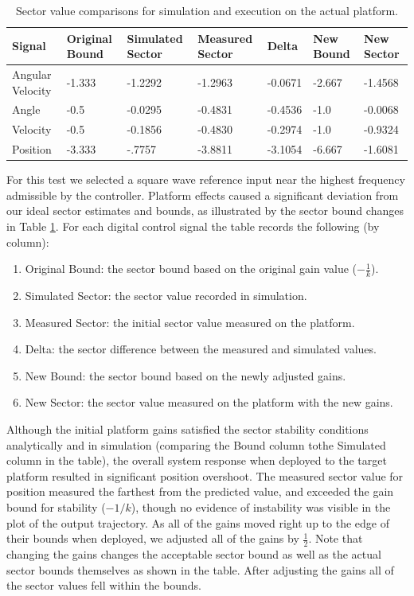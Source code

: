 \begin{table}[htb]
\centering

\begin{tabular}[width=0.85\columnwidth]{ | l | l | l | l | l | l | l | }

\hline
\textbf{Signal} & \textbf{Original Bound} & \textbf{Simulated Sector} & \textbf{Measured Sector} & \textbf{Delta} & \textbf{New Bound} & \textbf{New Sector} \\
\hline \hline
Angular Velocity & -1.333 & -1.2292 & -1.2963 & -0.0671 & -2.667 & -1.4568 \\
\hline
Angle & -0.5 & -0.0295 & -0.4831 & -0.4536 & -1.0 & -0.0068 \\
\hline
Velocity & -0.5 & -0.1856 & -0.4830 & -0.2974 & -1.0 &  -0.9324 \\
\hline
Position & -3.333 & -.7757 & -3.8811 & -3.1054 & -6.667 & -1.6081 \\
\hline
\end{tabular}
\caption{Sector value comparisons for simulation and execution on the actual platform.}
\label{tab:sectors}
\end{table}

For this test we selected a square wave reference input near the highest frequency admissible by 
the controller.  Platform effects caused a significant deviation from our ideal sector estimates and 
bounds, as illustrated by the sector bound changes in Table \ref{tab:sectors}. For each digital 
control signal the table records the following (by column):
\begin{enumerate}
 \item Original Bound: the sector bound based on the original gain value ($-\frac{1}{k}$).
 \item Simulated Sector: the sector value recorded in simulation.
 \item Measured Sector: the initial sector value measured on the platform.
 \item Delta: the sector difference between the measured and simulated values.
 \item New Bound: the sector bound based on the newly adjusted gains.
 \item New Sector: the sector value measured on the platform with the new gains.
\end{enumerate}
Although the initial platform gains satisfied the sector stability conditions analytically and in 
simulation (comparing the Bound column tothe Simulated column in the table), the overall system 
response when deployed to the target platform resulted in significant position overshoot.  The 
measured sector value for position measured the farthest from the predicted value, and exceeded 
the gain bound for stability ($-1/k$), though no evidence of instability was visible in the 
plot of the output trajectory.  As all of the gains moved right up to the edge of 
their bounds when deployed, we adjusted all of the gains by $\frac{1}{2}$. Note that changing the 
gains changes the acceptable sector bound as well as the actual sector bounds themselves as shown 
in the table.  After adjusting the gains all of the sector values fell within the bounds.

